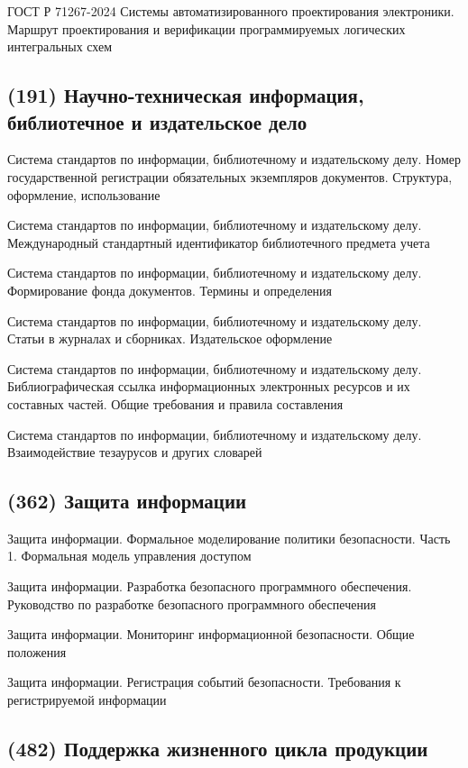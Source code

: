 ГОСТ Р 71267-2024 Системы автоматизированного проектирования электроники. Маршрут проектирования и верификации программируемых логических интегральных схем

\subsection{(191) Научно-техническая информация, библиотечное и издательское дело}

Система стандартов по информации, библиотечному и издательскому делу. Номер государственной регистрации обязательных экземпляров документов. Структура, оформление, использование

Система стандартов по информации, библиотечному и издательскому делу. Международный стандартный идентификатор библиотечного предмета учета

Система стандартов по информации, библиотечному и издательскому делу. Формирование фонда документов. Термины и определения

Система стандартов по информации, библиотечному и издательскому делу. Статьи в журналах и сборниках. Издательское оформление

Система стандартов по информации, библиотечному и издательскому делу. Библиографическая ссылка информационных электронных ресурсов и их составных частей. Общие требования и правила составления

Система стандартов по информации, библиотечному и издательскому делу. Взаимодействие тезаурусов и других словарей

\subsection{(362) Защита информации}

Защита информации. Формальное моделирование политики безопасности. Часть 1. Формальная модель управления доступом

Защита информации. Разработка безопасного программного обеспечения. Руководство по разработке безопасного программного обеспечения

Защита информации. Мониторинг информационной безопасности. Общие положения

Защита информации. Регистрация событий безопасности. Требования к регистрируемой информации

\subsection{(482) Поддержка жизненного цикла продукции}

